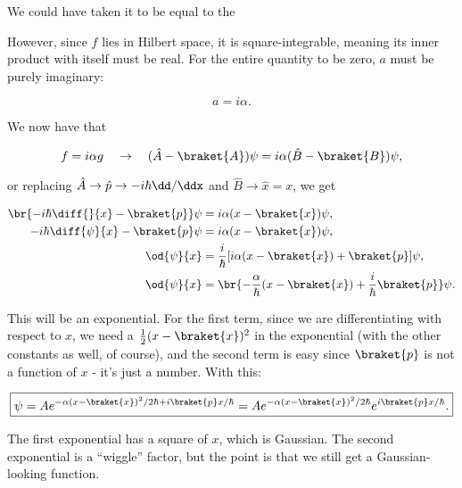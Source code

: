 We could have taken it to be equal to the 

However, since $f$ lies in Hilbert space, it is square-integrable, meaning its inner product with itself must be real. For the entire quantity to be zero, $a$ must be purely imaginary:

\begin{equation}
    a = i\alpha.
\end{equation}

We now have that

\begin{equation}
    f = i\alpha g \quad\rightarrow\quad (\hat{A} - \braket{A})\psi = i\alpha(\hat{B} - \braket{B})\psi,
\end{equation}

or replacing $\hat{A} \rightarrow \hat{p} \rightarrow -i\hbar\dd/\ddx$ and $\hat{B} \rightarrow \hat{x} = x$, we get

\begin{align}
    \br{-i\hbar\diff{}{x} - \braket{p}}\psi &= i\alpha(x - \braket{x})\psi, \\
    -i\hbar\diff{\psi}{x} - \braket{p}\psi &= i\alpha(x - \braket{x})\psi, \\ 
    \od{\psi}{x} &= \frac{i}{\hbar}[i\alpha(x - \braket{x}) + \braket{p}]\psi, \\
    \od{\psi}{x} &= \br{-\frac{\alpha}{\hbar}(x - \braket{x}) + \frac{i}{\hbar}\braket{p}}\psi.
\end{align}

This will be an exponential. For the first term, since we are differentiating with respect to $x$, we need a $\frac{1}{2}(x-\braket{x})^2$ in the exponential (with the other constants as well, of course), and the second term is easy since $\braket{p}$ is not a function of $x$ - it's just a number. With this:

\begin{equation}
    \boxed{\psi = Ae^{-\alpha(x-\braket{x})^2/2\hbar + i\braket{p}x/\hbar} = Ae^{-\alpha(x-\braket{x})^2/2\hbar}e^{i\braket{p}x/\hbar}.}
\end{equation}

The first exponential has a square of $x$, which is Gaussian. The second exponential is a ``wiggle'' factor, but the point is that we still get a Gaussian-looking function.